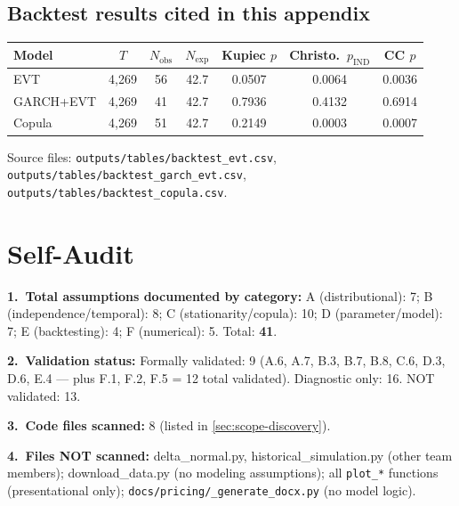 \documentclass[11pt,a4paper]{article}
\newcommand{\code}[1]{\texttt{#1}}
\begin{document}
\subsection{Backtest results cited in this appendix}

\begin{center}
\begin{tabular}{@{}lcccccc@{}}
\toprule
\textbf{Model} & \textbf{$T$} & \textbf{$N_{\text{obs}}$} & \textbf{$N_{\text{exp}}$} &
\textbf{Kupiec $p$} & \textbf{Christo.\ $p_{\text{IND}}$} & \textbf{CC $p$} \\
\midrule
EVT            & 4{,}269 & 56 & 42.7 & 0.0507 & 0.0064 & 0.0036 \\
GARCH+EVT      & 4{,}269 & 41 & 42.7 & 0.7936 & 0.4132 & 0.6914 \\
Copula         & 4{,}269 & 51 & 42.7 & 0.2149 & 0.0003 & 0.0007 \\
\bottomrule
\end{tabular}
\end{center}

Source files: \code{outputs/tables/backtest\_evt.csv},
\code{outputs/tables/backtest\_garch\_evt.csv},
\code{outputs/tables/backtest\_copula.csv}.

\section*{Self-Audit}\label{sec:audit}

\textbf{1.\ Total assumptions documented by category:}
A (distributional): 7; B (independence/temporal): 8;
C (stationarity/copula): 10; D (parameter/model): 7;
E (backtesting): 4; F (numerical): 5. Total: \textbf{41}.

\textbf{2.\ Validation status:}
Formally validated: 9 (A.6, A.7, B.3, B.7, B.8, C.6, D.3, D.6, E.4 --- plus
F.1, F.2, F.5 = 12 total validated). Diagnostic only: 16. NOT validated: 13.

\textbf{3.\ Code files scanned:} 8 (listed in \cref{sec:scope-discovery}).

\textbf{4.\ Files NOT scanned:} delta\_normal.py, historical\_simulation.py
(other team members); download\_data.py (no modeling assumptions); all
\code{plot\_*} functions (presentational only);
\code{docs/pricing/\_generate\_docx.py} (no model logic).
\end{document}
